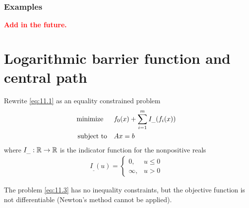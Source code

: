 \subsubsection{Examples}
\textcolor{red}{\textbf{Add in the future.}}

\section{Logarithmic barrier function and central path}
Rewrite \eqref{eq:11.1} as an equality constrained problem
\begin{align}
  \text{minimize\;\;}\quad& f_0(x)+\sum_{i=1}^mI_\_(f_i(x))\label{eq:11.3}\\
  \text{subject to}  \quad& Ax=b\nonumber
\end{align}
where $I_\_:\mathbb{R}\rightarrow\mathbb{R}$ is the indicator function for the nonpositive reals
\begin{align*}
  I_\_(u)=
    \begin{cases}
      0,& u\le 0\\
      \infty,& u>0
    \end{cases}
\end{align*}

The problem \eqref{eq:11.3} has no inequality constraints, but the objective function is not differentiable (Newton's method cannot be applied).

